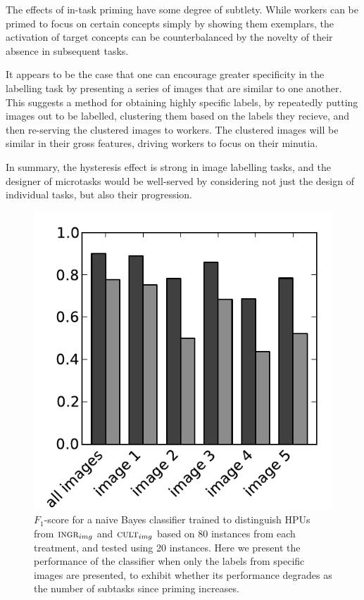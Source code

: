 \documentclass[letterpaper]{article}
\begin{document}
The effects of in-task priming have some degree of subtlety.  While workers
can be primed to focus on certain concepts simply by showing them exemplars, 
the activation of target concepts can be counterbalanced by the novelty of
their absence in subsequent tasks.

It appears to be the case that one can encourage greater specificity in the
labelling task by presenting a series of images that are similar to one 
another.  This suggests a method for obtaining highly specific
labels, by repeatedly putting images out to be labelled, clustering them based
on the labels they recieve, and then re-serving the clustered images to 
workers.  The clustered images will be similar in their gross features, driving
workers to focus on their minutia.

In summary, the hysteresis effect is strong in image labelling tasks, and 
the designer of microtasks would be well-served by considering 
not just the design of individual tasks, but also their progression.


\begin{figure}
	\includegraphics[scale=0.58]{../figs/longitudinalF1scores.pdf}
\caption{$F_1$-score for a naive Bayes classifier trained to distinguish
	HPUs from $\textsc{ingr}_{img}$ and $\textsc{cult}_{img}$ based on 80  
	instances from each treatment, and tested using 20 instances.  Here we
	present the performance of the classifier when only the labels from 
	specific images are presented, to exhibit whether its performance degrades 
	as the number of subtasks since priming increases. 
	}
	\label{fig:longitude}
\end{figure}
\end{document}
